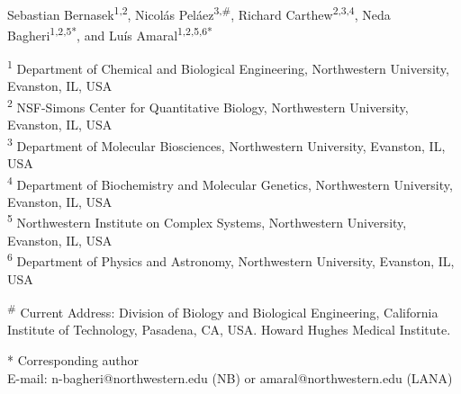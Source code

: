 \documentclass[10pt,letterpaper]{article}
\begin{document}
\vspace*{0.2in}

\begin{flushleft}
{\Large
\textbf{} %
}
\newline
\\
Sebastian Bernasek\textsuperscript{1,2},
Nicol\'as Pel\'aez\textsuperscript{3,\#},
Richard Carthew\textsuperscript{2,3,4},
Neda Bagheri\textsuperscript{1,2,5*}, and
Lu\'is Amaral\textsuperscript{1,2,5,6*}
\\
\bigskip

\textsuperscript{1} Department of Chemical and Biological Engineering, Northwestern University, Evanston, IL, USA
\\
\textsuperscript{2} NSF-Simons Center for Quantitative Biology, Northwestern University, Evanston, IL, USA
\\
\textsuperscript{3} Department of Molecular Biosciences, Northwestern University, Evanston, IL, USA
\\
\textsuperscript{4} Department of Biochemistry and Molecular Genetics, Northwestern University, Evanston, IL, USA
\\
\textsuperscript{5} Northwestern Institute on Complex Systems, Northwestern University, Evanston, IL, USA
\\
\textsuperscript{6} Department of Physics and Astronomy, Northwestern University, Evanston, IL, USA
\\
\bigskip

% 

\textsuperscript{\#} Current Address: Division of Biology and Biological Engineering, California Institute of Technology, Pasadena, CA, USA. Howard Hughes Medical Institute. 
\\
\bigskip


* Corresponding author \\
E-mail: n-bagheri@northwestern.edu (NB) or amaral@northwestern.edu (LANA) \\


\end{flushleft}
\end{document}
